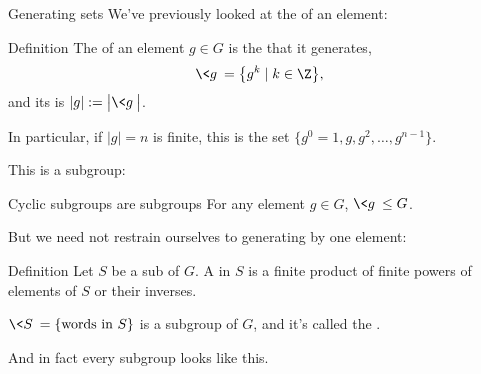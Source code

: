 \documentclass[8pt, handout]{beamer}
\newcommand{\Pause}{\pause}      %
\begin{document}
\begin{frame}{Generating sets}
  We've previously looked at the  of an element: \Pause
  \begin{block}{Definition}
    The  of an element $g\in G$ is the  that it generates,
    \[
    \<g\>=\big\{g^k\mid k\in\Z\big\},
    \]
    and its  is $|g|:=\big|\<g\>\big|$. \Pause

    In particular, if $|g| = n$ is finite, this is the set $\{g^0 = 1, g, g^2, \ldots, g^{n-1}\}$. \Pause
  \end{block}

  This is a subgroup: \Pause

  \begin{block}{Cyclic subgroups are subgroups}
    For any element $g\in G$, $\<g\> \leq G$.
  \end{block} \Pause

  But we need not restrain ourselves to generating by one element: \Pause

  \begin{block}{Definition}
    Let $S$ be a sub of $G$. \Pause A  in $S$ is a finite product of finite powers of elements of $S$ or their inverses. \Pause

    \smallskip
    $\<S\> = \{\text{words in } S\}$ is a subgroup of $G$, and it's called the .
  \end{block} \Pause

  And in fact every subgroup looks like this.
\end{frame}


\end{document}
